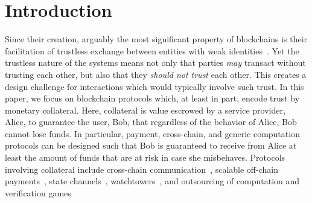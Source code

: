 \documentclass[runningheads]{llncs}
\newcommand{\dom}[1]{\todo[linecolor=green,backgroundcolor=green!25,bordercolor=green,inline,caption={}]{Comment by Dominik: #1}}
\begin{document}

\section{Introduction}
\label{sec:intro}


Since their creation, arguably the most significant property of blockchains is their facilitation of trustless exchange between entities with weak identities~\cite{rainer}.%
Yet the trustless nature of the systems means not only that parties \textit{may} transact without trusting each other, but also that they \textit{should not trust} each other.
This creates a design challenge for interactions which would typically involve such trust. 
In this paper, we focus on blockchain protocols which, at least in part, encode trust by monetary collateral.
Here, collateral is value escrowed by a service provider, Alice, to guarantee the user, Bob, that regardless of the behavior of Alice, Bob cannot lose funds. 
In particular, payment, cross-chain, and generic computation protocols can be designed such that Bob is guaranteed to receive from Alice at least the amount of funds that are at risk in case she misbehaves.
Protocols involving collateral include cross-chain communication~\cite{Zamyatin2019XCLAIM}, scalable off-chain payments~\cite{Khalil2019NOCUST}, state channels~\cite{dziembowski2018general}, watchtowers~\cite{mccorry2018pisa,avarikioti2019brick,avarikioti2018towards}, and outsourcing of computation and verification games~\cite{teutsch2017scalable}
\end{document}
